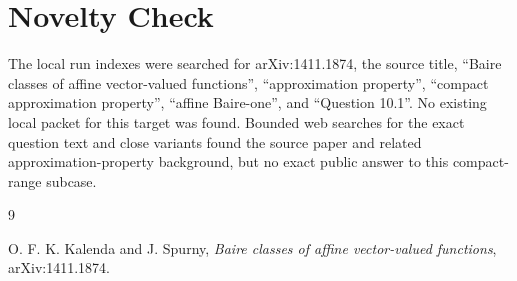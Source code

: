 \documentclass[11pt]{amsart}
\begin{document}
\section{Novelty Check}

The local run indexes were searched for arXiv:1411.1874, the source title,
``Baire classes of affine vector-valued functions'', ``approximation
property'', ``compact approximation property'', ``affine Baire-one'', and
``Question 10.1''.  No existing local packet for this target was found.
Bounded web searches for the exact question text and close variants found the
source paper and related approximation-property background, but no exact public
answer to this compact-range subcase.

\begin{thebibliography}{9}

O. F. K. Kalenda and J. Spurny,
\emph{Baire classes of affine vector-valued functions},
arXiv:1411.1874.

\end{thebibliography}
\end{document}

